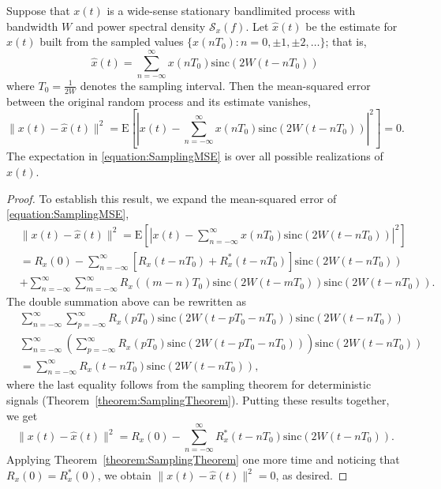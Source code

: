 \begin{theorem} \label{theorem:SamplingRandomSignals}
Suppose that $x(t)$ is a wide-sense stationary bandlimited process with bandwidth $W$ and power spectral density $\mathcal{S}_x (f)$.
Let $\hat{x}(t)$ be the estimate for $x(t)$ built from the sampled values $\{ x(nT_0) : n = 0, \pm 1, \pm 2, \ldots \}$; that is,
\begin{equation*}
\hat{x}(t) = \sum_{n=-\infty}^{\infty} x(nT_0) \mathrm{sinc} (2 W (t - nT_0))
\end{equation*}
where $T_0 = \frac{1}{2W}$ denotes the sampling interval.
Then the mean-squared error between the original random process and its estimate vanishes,
\begin{equation} \label{equation:SamplingMSE}
\| x(t) - \hat{x}(t) \|^2
= \mathrm{E} \left[ \left| x(t) - \sum_{n=-\infty}^{\infty}
x(nT_0) \mathrm{sinc} (2 W (t - nT_0)) \right|^2 \right] = 0 .
\end{equation}
The expectation in \eqref{equation:SamplingMSE} is over all possible realizations of $x(t)$.
\end{theorem}
\begin{proof}
To establish this result, we expand the mean-squared error of \eqref{equation:SamplingMSE},
\begin{equation*}
\begin{split}
&\| x(t) - \hat{x}(t) \|^2
= \mathrm{E} \left[ \left| x(t) - \sum_{n=-\infty}^{\infty} x(nT_0)
\mathrm{sinc}(2 W (t - nT_0)) \right|^2 \right] \\
&= R_x(0) - \sum_{n=-\infty}^{\infty} [ R_x(t-nT_0) + R_x^*(t-nT_0) ]
\mathrm{sinc}(2 W (t - nT_0)) \\
&+ \sum_{n=-\infty}^{\infty} \sum_{m=-\infty}^{\infty} R_x((m-n)T_0)
\mathrm{sinc}(2 W (t - mT_0)) \mathrm{sinc}(2 W (t - nT_0)) .
\end{split}
\end{equation*}
The double summation above can be rewritten as
\begin{equation*}
\begin{split}
&\sum_{n=-\infty}^{\infty} \sum_{p=-\infty}^{\infty} R_x(pT_0)
\mathrm{sinc}(2 W (t - pT_0 - nT_0)) \mathrm{sinc}(2 W (t - nT_0)) \\
&\sum_{n=-\infty}^{\infty} \left( \sum_{p=-\infty}^{\infty} R_x(pT_0)
\mathrm{sinc}(2 W (t - pT_0 - nT_0)) \right) \mathrm{sinc}(2 W (t - nT_0)) \\
&= \sum_{n=-\infty}^{\infty} R_x(t - nT_0) \mathrm{sinc}(2 W (t - nT_0)) ,
\end{split}
\end{equation*}
where the last equality follows from the sampling theorem for deterministic signals (Theorem~\ref{theorem:SamplingTheorem}).
Putting these results together, we get
\begin{equation*}
\| x(t) - \hat{x}(t) \|^2
= R_x(0) - \sum_{n=-\infty}^{\infty} R_x^*(t-nT_0) \mathrm{sinc}(2 W (t - nT_0)) .
\end{equation*}
Applying Theorem~\ref{theorem:SamplingTheorem} one more time and noticing that $R_x(0) = R_x^*(0)$, we obtain $\| x(t) - \hat{x}(t) \|^2 = 0$, as desired.
\end{proof}

